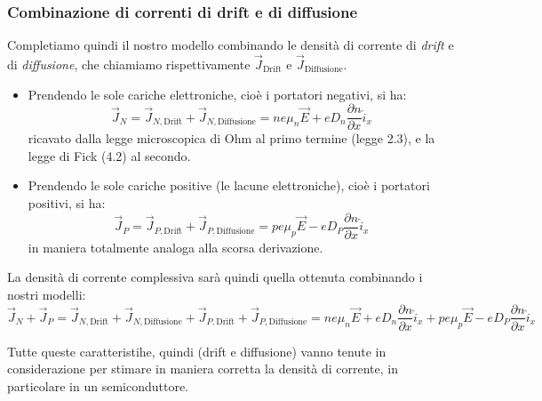 \documentclass[a4paper,11pt]{article}
\begin{document}
\subsubsection{Combinazione di correnti di drift e di diffusione}
Completiamo quindi il nostro modello combinando le densità di corrente di \textit{drift} e di \textit{diffusione}, che chiamiamo rispettivamente $\vec{J}_{\text{Drift}}$ e $\vec{J}_{\text{Diffusione}}$.

\begin{itemize}
	\item Prendendo le sole cariche elettroniche, cioè i portatori negativi, si ha:
$$
\vec{J}_N = \vec{J}_{N, \text{Drift}} + \vec{J}_{N, \text{Diffusione}} = n e \mu_n \vec{E} + e D_n \frac{\partial n}{\partial x} \hat{i}_x
$$
ricavato dalla legge microscopica di Ohm al primo termine (legge 2.3), e la legge di Fick (4.2) al secondo.
	\item Prendendo le sole cariche positive (le lacune elettroniche), cioè i portatori positivi, si ha:
$$
\vec{J}_P = \vec{J}_{P, \text{Drift}} + \vec{J}_{P, \text{Diffusione}} = p e \mu_p \vec{E} - e D_P \frac{\partial n}{\partial x} \hat{i}_x
$$
in maniera totalmente analoga alla scorsa derivazione.
\end{itemize}

La densità di corrente complessiva sarà quindi quella ottenuta combinando i nostri modelli:
$$
\vec{J}_N + \vec{J}_P = \vec{J}_{N, \text{Drift}} + \vec{J}_{N, \text{Diffusione}} + \vec{J}_{P, \text{Drift}} + \vec{J}_{P, \text{Diffusione}} = n e \mu_n \vec{E} + e D_n \frac{\partial n}{\partial x} \hat{i}_x + p e \mu_p \vec{E} - e D_P \frac{\partial n}{\partial x} \hat{i}_x 
$$

Tutte queste caratteristihe, quindi (drift e diffusione) vanno tenute in considerazione per stimare in maniera corretta la densità di corrente, in particolare in un semiconduttore.
\end{document}
